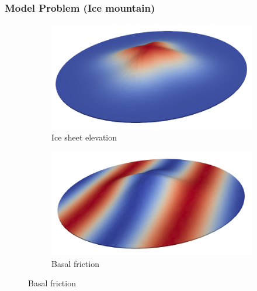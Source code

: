 \documentclass[10pt,final,xcolor=dvipsnames]{beamer}
\begin{document}
\begin{frame}
	\frametitle{Model Problem (Ice mountain)}
	\begin{figure}
		\centering
		\begin{subfigure}[b]{0.49\textwidth}
			\centering
			\includegraphics[scale=0.26]{ice_sheet_elevation.png}
			\caption{Ice sheet elevation}
		\end{subfigure}
		\hfill
		\begin{subfigure}[b]{0.49\textwidth}
			\centering
			\includegraphics[scale=0.26]{basal_friction.png}
			\caption{Basal friction}
		\end{subfigure}
		

\end{figure}
\end{frame}
\end{document}
